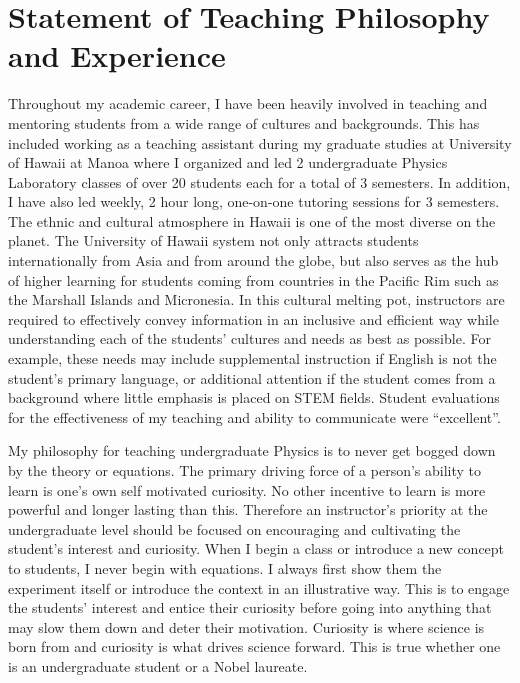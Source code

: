 \documentclass[10pt]{article} %
\begin{document}

\clearpage
\section{Statement of Teaching Philosophy and Experience}

Throughout my academic career, I have been heavily involved in teaching and
mentoring students from a wide range of cultures and backgrounds. This has
included working as a teaching assistant during my graduate studies at
University of Hawaii at Manoa where I organized and led 2 undergraduate Physics
Laboratory classes of over 20 students each for a total of 3 semesters. In
addition, I have also led weekly, 2 hour long, one-on-one tutoring sessions for
3 semesters. The ethnic and cultural atmosphere in Hawaii is one of the most
diverse on the planet. The University of Hawaii system not only attracts
students internationally from Asia and from around the globe, but also serves
as the hub of higher learning for students coming from countries in the Pacific
Rim such as the Marshall Islands and Micronesia. In this cultural melting pot,
instructors are required to effectively convey information in an inclusive and
efficient way while understanding each of the students' cultures and needs as
best as possible. For example, these needs may include supplemental instruction
if English is not the student's primary language, or additional attention if
the student comes from a background where little emphasis is placed on STEM
fields. Student evaluations for the effectiveness of my teaching and ability to
communicate were ``excellent''.

My philosophy for teaching undergraduate Physics is to never get bogged down by
the theory or equations. The primary driving force of a person's ability to
learn is one's own self motivated curiosity. No other incentive to learn is
more powerful and longer lasting than this. Therefore an instructor's priority
at the undergraduate level should be focused on encouraging and cultivating the
student's interest and curiosity. When I begin a class or introduce a new
concept to students, I never begin with equations. I always first show them the
experiment itself or introduce the context in an illustrative way. This is to
engage the students' interest and entice their curiosity before going into
anything that may slow them down and deter their motivation. Curiosity is where
science is born from and curiosity is what drives science forward. This is true
whether one is an undergraduate student or a Nobel laureate.
\end{document}
